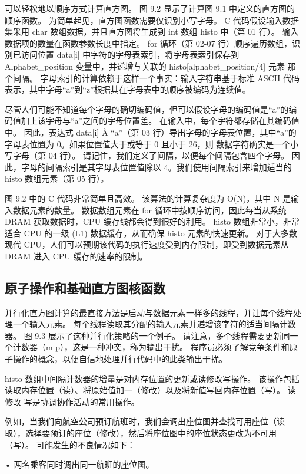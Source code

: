 可以轻松地以顺序方式计算直方图。 图 9.2 显示了计算图 9.1 中定义的直方图的顺序函数。 为简单起见，直方图函数需要仅识别小写字母。 C 代码假设输入数据集采用 char 数组数据，并且直方图将生成到 int 数组 histo 中（第 01 行）。 输入数据项的数量在函数参数长度中指定。 for 循环（第 02-07 行）顺序遍历数组，识别已访问位置 data[i] 中字符的字母表索引，将字母表索引保存到 Alphabet\_position 变量中，并递增与关联的 histo[alphabet\_position/4] 元素 那个间隔。 字母索引的计算依赖于这样一个事实：输入字符串基于标准 ASCII 代码表示，其中字母“a”到“z”根据其在字母表中的顺序被编码为连续值。

尽管人们可能不知道每个字母的确切编码值，但可以假设字母的编码值是“a”的编码值加上该字母与“a”之间的字母位置差。 在输入中，每个字符都存储在其编码值中。 因此，表达式 data[i] À “a”（第 03 行）导出字母的字母表位置，其中“a”的字母表位置为 0。如果位置值大于或等于 0 且小于 26，则 数据字符确实是一个小写字母（第 04 行）。 请记住，我们定义了间隔，以便每个间隔包含四个字母。 因此，字母的间隔索引是其字母表位置值除以 4。我们使用间隔索引来增加适当的 histo 数组元素（第 05 行）。

图 9.2 中的 C 代码非常简单且高效。 该算法的计算复杂度为 O(N)，其中 N 是输入数据元素的数量。 数据数组元素在 for 循环中按顺序访问，因此每当从系统 DRAM 获取数据时，CPU 缓存线都会得到很好的利用。 histo 数组非常小，非常适合 CPU 的一级 (L1) 数据缓存，从而确保 histo 元素的快速更新。 对于大多数现代 CPU，人们可以预期该代码的执行速度受到内存限制，即受到数据元素从 DRAM 进入 CPU 缓存的速率的限制。

\subsection{原子操作和基础直方图核函数}
并行化直方图计算的最直接方法是启动与数据元素一样多的线程，并让每个线程处理一个输入元素。 每个线程读取其分配的输入元素并递增该字符的适当间隔计数器。 图 9.3 展示了这种并行化策略的一个例子。 请注意，多个线程需要更新同一个计数器（m-p），这是一种冲突，称为输出干扰。 程序员必须了解竞争条件和原子操作的概念，以便自信地处理并行代码中的此类输出干扰。

histo 数组中间隔计数器的增量是对内存位置的更新或读修改写操作。 该操作包括读取内存位置（读）、将原始值加一（修改）以及将新值写回内存位置（写）。 读-修改-写是协调协作活动的常用操作。

例如，当我们向航空公司预订航班时，我们会调出座位图并查找可用座位（读取），选择要预订的座位（修改），然后将座位图中的座位状态更改为不可用 （写）。 可能发生的不良情况如下：

• 两名乘客同时调出同一航班的座位图。

